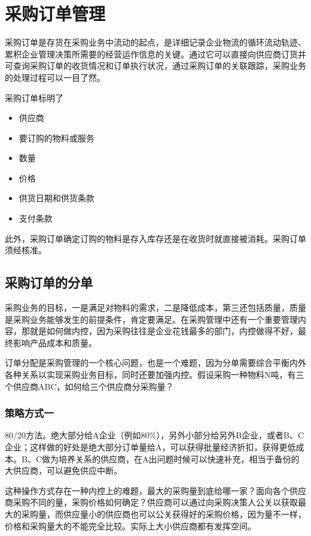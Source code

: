 \section {采购订单管理}

    采购订单是存货在采购业务中流动的起点，是详细记录企业物流的循环流动轨迹、累积企业管理决策所需要的经营运作信息的关键。通过它可以直接向供应商订货并可查询采购订单的收货情况和订单执行状况，通过采购订单的关联跟踪，采购业务的处理过程可以一目了然。

    采购订单标明了
        \begin{itemize}
            \item  供应商
            \item  要订购的物料或服务
            \item  数量
            \item  价格
            \item  供货日期和供货条款
            \item  支付条款
        \end{itemize}
    此外，采购订单确定订购的物料是存入库存还是在收货时就直接被消耗。采购订单须经核准。

\subsection {采购订单的分单}

        采购业务的目标，一是满足对物料的需求，二是降低成本，第三还包括质量，质量是采购业务能够发生的前提条件，肯定要满足。在采购管理中还有一个重要管理内容，那就是如何做内控，因为采购往往是企业花钱最多的部门，内控做得不好，最终影响产品成本和质量。

        订单分配是采购管理的一个核心问题，也是一个难题，因为分单需要综合平衡内外各种关系以实现采购业务目标，同时还要加强内控。假设采购一种物料N吨，有三个供应商ABC，如何给三个供应商分采购量？

    \subsubsection {策略方式一}

        80/20方法。绝大部分给A企业（例如80\%），另外小部分给另外B企业，或者B、C企业；这样做的好处是绝大部分订单量给A，可以获得批量经济折扣，获得更低成本。B、C做为培养关系的供应商，在A出问题时候可以快速补充，相当于备份的大供应商，可以避免供应中断。

        这种操作方式存在一种内控上的难题，最大的采购量到底给哪一家？面向各个供应商采购不同的量，采购价格如何确定？供应商可以通过向采购决策人公关以获取最大的采购量，而供应量小的供应商也可以公关获得好的采购价格，因为量不一样，价格和采购量大的不能完全比较。实际上大小供应商都有发挥空间。

